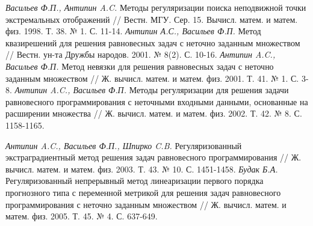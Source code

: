 \begin{thebibliography}{}
		
		 \textit{Васильев Ф.П., Антипин A.C.} Методы регуляризации поиска неподвижной точки экстремальных отображений // Вестн. МГУ. Сер. 15. Вычисл. матем. и матем. физ. 1998. Т. 38. № 1. С. 11-14.
		 \textit{Антипин А.С., Васильев Ф.П.} Метод квазирешений для решения равновесных задач с неточно заданным
		множеством // Вестн. ун-та Дружбы народов. 2001. № 8(2). С. 10-16.
		 \textit{Антипин A.C., Васильев Ф.П.} Метод невязки для решения равновесных задач с неточно заданным множеством // Ж. вычисл. матем. и матем. физ. 2001. Т. 41. № 1. С. 3-8.
		 \textit{Антипин A.C., Васильев Ф.П.} Методы регуляризации для решения задачи равновесного программирования с неточными входными данными, основанные на расширении множества // Ж. вычисл. матем.
		и матем. физ. 2002. Т. 42. № 8. С. 1158-1165.
		
		 \textit{Антипин A.C., Васильев Ф.П., Шпирко C.B.} Регуляризованный экстраградиентный метод решения задач
		равновесного программирования // Ж. вычисл. матем. и матем. физ. 2003. Т. 43. № 10. С. 1451-1458.
		 \textit{Будак Б.А.} Регуляризованный непрерывный метод линеаризации первого порядка прогнозного типа с переменной метрикой для решения задач равновесного программирования с неточно заданным множеством // Ж. вычисл. матем. и матем. физ. 2005. Т. 45. № 4. С. 637-649.
		
		
		\end{thebibliography}
	\endgroup
	\clearpage